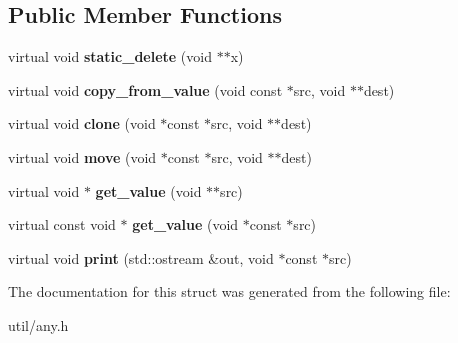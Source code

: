 \subsection*{Public Member Functions}
\begin{DoxyCompactItemize}
\item 
\mbox{\label{structtrees_1_1anyimpl_1_1big__any__policy_a9a8ea0c5cd0437b145894c70f2b15579}} 
virtual void {\bfseries static\+\_\+delete} (void $\ast$$\ast$x)
\item 
\mbox{\label{structtrees_1_1anyimpl_1_1big__any__policy_aeb0656a2273d0705996467b8cf731ed9}} 
virtual void {\bfseries copy\+\_\+from\+\_\+value} (void const $\ast$src, void $\ast$$\ast$dest)
\item 
\mbox{\label{structtrees_1_1anyimpl_1_1big__any__policy_a2a79012e6153f04843bba9677f7593c1}} 
virtual void {\bfseries clone} (void $\ast$const $\ast$src, void $\ast$$\ast$dest)
\item 
\mbox{\label{structtrees_1_1anyimpl_1_1big__any__policy_ad1e9d6e184cb858290a2ffd0bf6cf345}} 
virtual void {\bfseries move} (void $\ast$const $\ast$src, void $\ast$$\ast$dest)
\item 
\mbox{\label{structtrees_1_1anyimpl_1_1big__any__policy_a91205cd7307664b48ae668d90ff3cb27}} 
virtual void $\ast$ {\bfseries get\+\_\+value} (void $\ast$$\ast$src)
\item 
\mbox{\label{structtrees_1_1anyimpl_1_1big__any__policy_aede1f51b8cba7656baf5367d5f4b8fbb}} 
virtual const void $\ast$ {\bfseries get\+\_\+value} (void $\ast$const $\ast$src)
\item 
\mbox{\label{structtrees_1_1anyimpl_1_1big__any__policy_a574865dc6e71801333cb58e21882cd3d}} 
virtual void {\bfseries print} (std\+::ostream \&out, void $\ast$const $\ast$src)
\end{DoxyCompactItemize}


The documentation for this struct was generated from the following file\+:\begin{DoxyCompactItemize}
\item 
util/any.\+h\end{DoxyCompactItemize}
